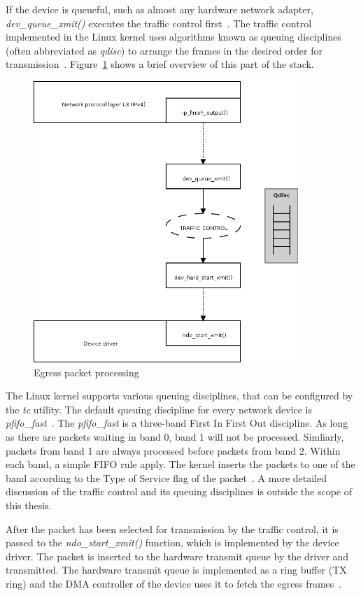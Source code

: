 If the device is queueful, such as almost any hardware network adapter, {\it{dev\_queue\_xmit()}}
executes the traffic control first~\cite{understanding-internals}.
The traffic control implemented in the Linux kernel uses algorithms known as queuing disciplines
(often abbreviated as {\it{qdisc}})
to arrange the frames in the desired order for transmission~\cite{understanding-internals}.
Figure~\ref{fig:linux-egress-packet} shows a brief overview of this part of the stack.
\begin{figure}
	\centering
	\includegraphics[width=10cm,keepaspectratio]{fig/kernel-layer2-flow.png}
	\caption{Egress packet processing}
	\label{fig:linux-egress-packet}
	\bigskip
\end{figure}

The Linux kernel supports various queuing disciplines, that can be configured by the {\it{tc}} utility.
The default queuing discipline for every network device is {\it{pfifo\_fast}}~\cite{linux-kernel-networking}.
The {\it{pfifo\_fast}} is a three-band First In First Out discipline.
As long as there are packets waiting in band 0, band 1 will not be processed.
Simliarly, packets from band 1 are always processed before packets from band 2.
Within each band, a simple FIFO rule apply.
The kernel inserts the packets to one of the band according to the Type of Service flag of the packet~\cite{tcpip-in-linux}.
A more detailed discussion of the traffic control and its queuing disciplines is outside the scope of this thesis.

After the packet has been selected for transmission by the traffic control, it is passed to the
{\it{ndo\_start\_xmit()}} function, which is implemented by the device driver.
The packet is inserted to the hardware transmit queue by the driver and transmitted.
The hardware transmit queue is implemented as a ring buffer (TX ring)
and the DMA controller of the device uses it to fetch the egress frames~\cite{kernel-source}.

